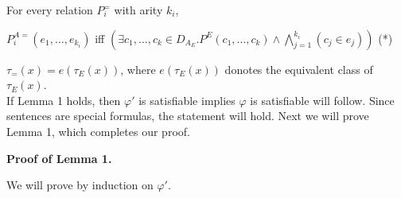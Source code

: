 \documentclass[12pt]{article}
\renewcommand{\phi}{\varphi}
\begin{document}
\begin{enumerate}
\begin{itemize}
			For every relation $P_i^=$ with arity $k_i$,
			
			$P_i^{A=}(e_1,...,e_{k_i})$ iff $(\exists c_1,...,c_k\in D_{A_E}. P^E(c_1,...,c_k)\wedge \bigwedge_{j=1}^{k_i}(c_j\in e_j))$ (*)
			
			$\tau_=(x)=e(\tau_E(x))$, where $e(\tau_E(x))$ donotes the equivalent class of $\tau_E(x)$. \\
		
		
		If Lemma 1 holds, then $\phi'$ is satisfiable implies $\phi$ is satisfiable will follow. Since sentences are special formulas, the statement will hold. Next we will prove Lemma 1, which completes our proof.
			
			\bigskip
		\textbf{Proof of Lemma 1.}
		
		We will prove by induction on $\phi'$.
		

\end{itemize}
\end{enumerate}
\end{document}

